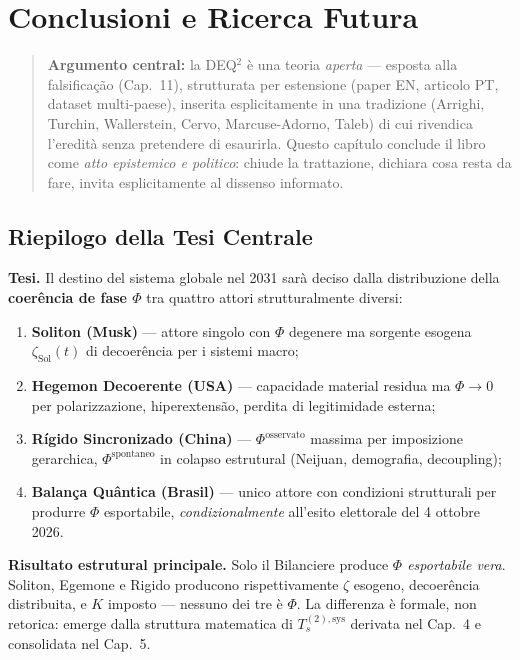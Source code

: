 \chapter{Conclusioni e Ricerca
Futura}\label{conclusioni-e-ricerca-futura}

\begin{quote}
\textbf{Argumento central:} la DEQ$^2$ è una teoria \emph{aperta} ---
esposta alla falsificação (Cap.~11), strutturata per estensione (paper
EN, articolo PT, dataset multi-paese), inserita esplicitamente in una
tradizione (Arrighi, Turchin, Wallerstein, Cervo, Marcuse-Adorno, Taleb)
di cui rivendica l'eredità senza pretendere di esaurirla. Questo
capítulo conclude il libro come \emph{atto epistemico e politico}:
chiude la trattazione, dichiara cosa resta da fare, invita
esplicitamente al dissenso informato.
\end{quote}



\section{Riepilogo della Tesi
Centrale}\label{riepilogo-della-tesi-centrale}

\Proved{} \textbf{Tesi.} Il destino del sistema globale nel 2031 sarà
deciso dalla distribuzione della \textbf{coerência de fase \(\Phi\)} tra
quattro attori strutturalmente diversi:

\begin{enumerate}
\def\labelenumi{\arabic{enumi}.}
\tightlist
\item
  \textbf{Soliton (Musk)} --- attore singolo con \(\Phi\) degenere ma
  sorgente esogena \(\zeta_{\text{Sol}}(t)\) di decoerência per i sistemi
  macro;
\item
  \textbf{Hegemon Decoerente (USA)} --- capacidade material residua ma
  \(\Phi \to 0\) per polarizzazione, hiperextensão, perdita di
  legitimidade esterna;
\item
  \textbf{Rígido Sincronizado (China)} --- \(\Phi^{\text{osservato}}\)
  massima per imposizione gerarchica, \(\Phi^{\text{spontaneo}}\) in
  colapso estrutural (Neijuan, demografia, decoupling);
\item
  \textbf{Balança Quântica (Brasil)} --- unico attore con
  condizioni strutturali per produrre \(\Phi\) esportabile,
  \emph{condizionalmente} all'esito elettorale del 4 ottobre 2026.
\end{enumerate}

\Hypoth{} \textbf{Risultato estrutural principale.} Solo il Bilanciere
produce \emph{\(\Phi\) esportabile vera}. Soliton, Egemone e Rigido
producono rispettivamente \(\zeta\) esogeno, decoerência distribuita, e
\(K\) imposto --- nessuno dei tre è \(\Phi\). La differenza è formale,
non retorica: emerge dalla struttura matematica di
\(T_s^{(2),\text{sys}}\) derivata nel Cap.~4 e consolidata nel Cap.~5.



